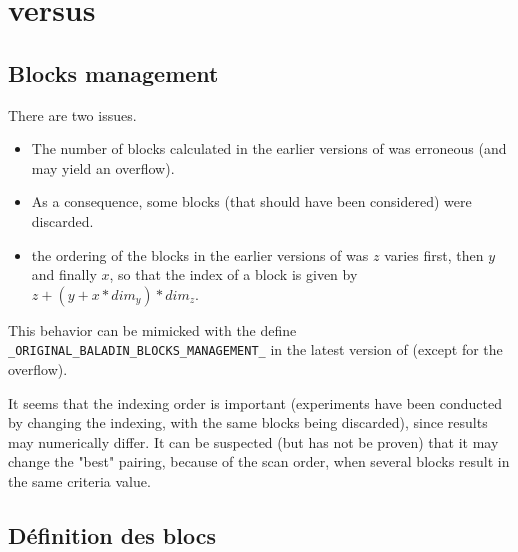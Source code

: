 \chapter{\blockmatching versus \baladin}

\section{Blocks management}

There are two issues.

\begin{itemize}

\item The number of blocks calculated in the earlier versions of \baladin was erroneous (and may yield an overflow). 
\item As a consequence, some blocks (that should have been considered) were discarded.
\item the ordering of the blocks in the earlier versions of \baladin was $z$ varies first, then $y$ and finally $x$, so that the index of a block is given by $z + ( y + x * dim_y) * dim_z$. 

\end{itemize}

This behavior can be mimicked with the define \verb|_ORIGINAL_BALADIN_BLOCKS_MANAGEMENT_| in the latest version of \baladin (except for the overflow). 

It seems that the indexing order is important (experiments have been conducted by changing the indexing, with the same blocks being discarded), since results may numerically differ. It can be suspected (but has not be proven) that it may change the "best" pairing, because of the scan order, when several blocks result in the same criteria value.



\section{D\'efinition des blocs}

